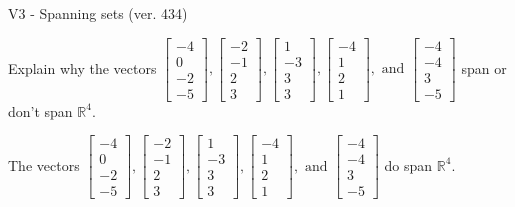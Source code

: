 \begin{exercise}
  \begin{exerciseTitle}V3 - Spanning sets (ver. 434)\end{exerciseTitle}
  \begin{exerciseStatement}
    Explain why the vectors \(\left[\begin{array}{r}
-4 \\
0 \\
-2 \\
-5
\end{array}\right] , \left[\begin{array}{r}
-2 \\
-1 \\
2 \\
3
\end{array}\right] , \left[\begin{array}{r}
1 \\
-3 \\
3 \\
3
\end{array}\right] , \left[\begin{array}{r}
-4 \\
1 \\
2 \\
1
\end{array}\right] , \text{ and } \left[\begin{array}{r}
-4 \\
-4 \\
3 \\
-5
\end{array}\right]\) span or don't span \(\mathbb{R}^4\). 
	


  \end{exerciseStatement}
  \begin{exerciseAnswer}
   The vectors \(\left[\begin{array}{r}
-4 \\
0 \\
-2 \\
-5
\end{array}\right] , \left[\begin{array}{r}
-2 \\
-1 \\
2 \\
3
\end{array}\right] , \left[\begin{array}{r}
1 \\
-3 \\
3 \\
3
\end{array}\right] , \left[\begin{array}{r}
-4 \\
1 \\
2 \\
1
\end{array}\right] , \text{ and } \left[\begin{array}{r}
-4 \\
-4 \\
3 \\
-5
\end{array}\right]\) 
  	 do  
	span \(\mathbb{R}^4\).
  



\end{exerciseAnswer}
\end{exercise}
